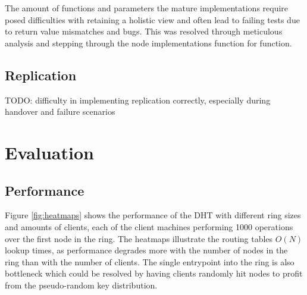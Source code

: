 \documentclass[a4paper, 11pt]{article}
\begin{document}
The amount of functions and parameters the mature implementations require posed difficulties with retaining a holistic view and often lead to failing tests due to return value mismatches and bugs. 
This was resolved through meticulous analysis and stepping through the node implementations function for function.

\subsection{Replication}

TODO: difficulty in implementing replication correctly, especially during handover and failure scenarios

\section{Evaluation}

\subsection{Performance}

Figure \ref{fig:heatmaps} shows the performance of the DHT with different ring sizes and amounts of clients, each of the client machines performing 1000 operations over the first node in the ring.
The heatmaps illustrate the routing tables $O(N)$ lookup times, as performance degrades more with the number of nodes in the ring than with the number of clients.
The single entrypoint into the ring is also bottleneck which could be resolved by having clients randomly hit nodes to profit from the pseudo-random key distribution.
\end{document}
